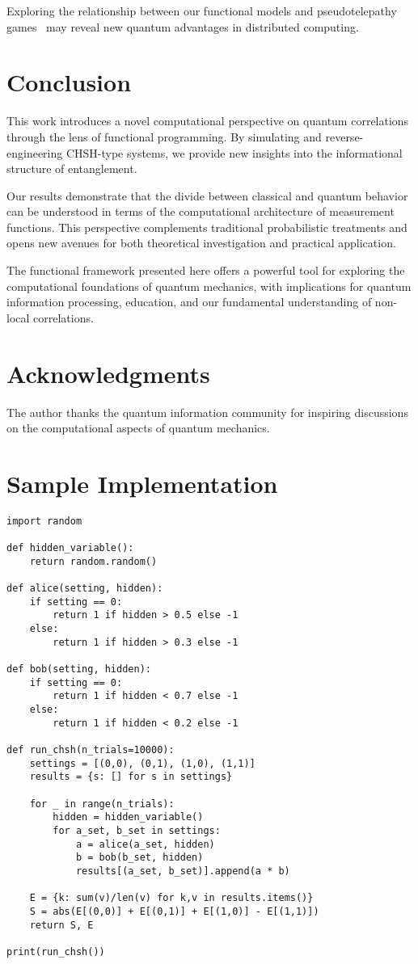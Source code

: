 \documentclass[11pt,a4paper]{article}
\begin{document}
Exploring the relationship between our functional models and pseudotelepathy games~\cite{brassard2005} may reveal new quantum advantages in distributed computing.

\section{Conclusion}

This work introduces a novel computational perspective on quantum correlations through the lens of functional programming. By simulating and reverse-engineering CHSH-type systems, we provide new insights into the informational structure of entanglement.

Our results demonstrate that the divide between classical and quantum behavior can be understood in terms of the computational architecture of measurement functions. This perspective complements traditional probabilistic treatments and opens new avenues for both theoretical investigation and practical application.

The functional framework presented here offers a powerful tool for exploring the computational foundations of quantum mechanics, with implications for quantum information processing, education, and our fundamental understanding of non-local correlations.

\section*{Acknowledgments}

The author thanks the quantum information community for inspiring discussions on the computational aspects of quantum mechanics.

\appendix

\section{Sample Implementation}

\begin{verbatim}
import random

def hidden_variable():
    return random.random()

def alice(setting, hidden):
    if setting == 0:
        return 1 if hidden > 0.5 else -1
    else:
        return 1 if hidden > 0.3 else -1

def bob(setting, hidden):
    if setting == 0:
        return 1 if hidden < 0.7 else -1
    else:
        return 1 if hidden < 0.2 else -1

def run_chsh(n_trials=10000):
    settings = [(0,0), (0,1), (1,0), (1,1)]
    results = {s: [] for s in settings}

    for _ in range(n_trials):
        hidden = hidden_variable()
        for a_set, b_set in settings:
            a = alice(a_set, hidden)
            b = bob(b_set, hidden)
            results[(a_set, b_set)].append(a * b)

    E = {k: sum(v)/len(v) for k,v in results.items()}
    S = abs(E[(0,0)] + E[(0,1)] + E[(1,0)] - E[(1,1)])
    return S, E

print(run_chsh())
\end{verbatim}
\end{document}
